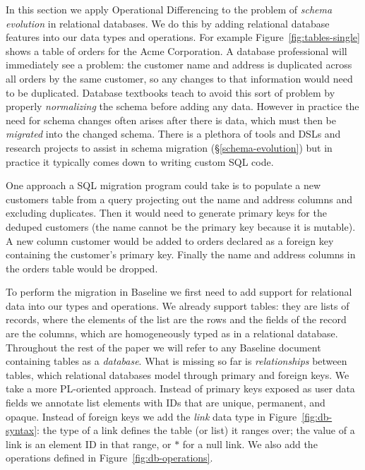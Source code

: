 \documentclass[english,submission]{programming}
\theoremstyle{definition}
\newcommand{\citet}[1]{\citeauthor*{#1}~\cite{#1}}
\begin{document}
In this section we apply Operational Differencing to the problem of \textit{schema evolution} in relational databases. We do this by adding relational database features into our data types and operations.
For example Figure~\ref{fig:tables-single} shows a table of orders for the Acme Corporation. A database professional will immediately see a problem: the customer name and address is duplicated across all orders by the same customer, so any changes to that information would need to be duplicated.
Database textbooks teach to avoid this sort of problem by properly \textit{normalizing} the schema before adding any data. However in practice the need for schema changes often arises after there is data, which must then be \textit{migrated} into the changed schema. There is a plethora of tools and DSLs and research projects to assist in schema migration (\S\ref{schema-evolution})
but in practice it typically comes down to writing custom SQL code.

One approach a SQL migration program could take is to populate a new \textsf{customers} table from a query projecting out the \textsf{name} and \textsf{address} columns and excluding duplicates. Then it would need to generate primary keys for the deduped customers (the name cannot be the primary key because it is mutable). A new column \textsf{customer} would be added to \textsf{orders} declared as a foreign key containing the customer's primary key. Finally the \textsf{name} and \textsf{address} columns in the \textsf{orders} table would be dropped.

To perform the migration in Baseline we first need to add support for relational data into our types and operations.
We already support tables: they are lists of records, where the elements of the list are the rows and the fields of the record are the columns, which are homogeneously typed as in a relational database.
Throughout the rest of the paper we will refer to any Baseline document containing tables as a \textit{database}.
What is missing so far is \textit{relationships} between tables, which relational databases model through primary and foreign keys. We take a more PL-oriented approach.
Instead of primary keys exposed as user data fields we annotate list elements with IDs that are unique, permanent, and opaque. Instead of foreign keys we add the \textit{link} data type in Figure~\ref{fig:db-syntax}: the type of a link defines the table (or list) it ranges over; the value of a link is an element ID in that range, or $*$ for a null link. We also add the operations defined in Figure~\ref{fig:db-operations}.
\end{document}
